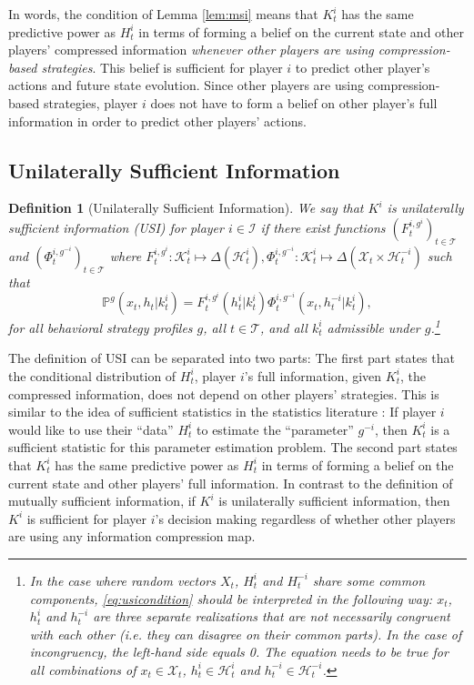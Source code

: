 \documentclass[pdflatex,sn-basic]{sn-jnl}
\renewcommand{\Pr}{\mathbb{P}}
\newcommand{\Comp}{K}
\newcommand{\comp}{k}
\newcommand{\Compset}{\mathcal{K}}
\theoremstyle{thmstyleone}%
\theoremstyle{thmstyletwo}%
\theoremstyle{thmstylethree}%
\newtheorem{defn}{Definition}
\begin{document}
In words, the condition of Lemma \ref{lem:msi} means that $\Comp_t^i$ has the same predictive power as $H_t^i$ in terms of forming a belief on the current state and other players' compressed information \emph{whenever other players are using compression-based strategies}. This belief is sufficient for player $i$ to predict other player's actions and future state evolution. Since other players are using compression-based strategies, player $i$ does not have to form a belief on other player's full information in order to predict other players' actions.

\subsection{Unilaterally Sufficient Information}\label{sec:usi}

\begin{defn}[Unilaterally Sufficient Information]\label{def:usi}
	We say that $\Comp^i$ is \emph{unilaterally sufficient information} (USI) for player $i\in\mathcal{I}$ if there exist functions $(F_t^{i, g^i})_{t\in\mathcal{T}}$ and $(\Phi_t^{i, g^{-i}})_{t\in\mathcal{T}}$ where $F_t^{i, g^i}\colon\Compset_t^i\mapsto \Delta(\mathcal{H}_t^i), \Phi_t^{i, g^{-i}}\colon\Compset_t^i \mapsto \Delta(\mathcal{X}_t\times \mathcal{H}_t^{-i})$ such that
	\begin{equation}\label{eq:usicondition}
		\Pr^{g}(x_t, h_t|\comp_t^i) = F_t^{i, g^i}(h_t^i|\comp_t^i)\Phi_t^{i,g^{-i}}(x_t, h_t^{-i}|\comp_t^i),
	\end{equation}
	for all behavioral strategy profiles $g$, all $t\in\mathcal{T}$, and all $\comp_t^i$ admissible under $g$.\footnote{In the case where random vectors $X_t$, $H_t^i$ and $H_t^{-i}$ share some common components, \eqref{eq:usicondition} should be interpreted in the following way: $x_t$, $h_t^i$ and $h_t^{-i}$ are three separate realizations that are not necessarily congruent with each other (i.e. they can disagree on their common parts). In the case of incongruency, the left-hand side equals 0. The equation needs to be true for all combinations of $x_t\in \mathcal{X}_t$, $h_t^i\in\mathcal{H}_t^i$ and $h_t^{-i}\in\mathcal{H}_t^{-i}$.}
\end{defn}


The definition of USI can be separated into two parts: The first part states that the conditional distribution of $H_t^i$, player $i$'s full information, given $\Comp_t^i$, the compressed information, does not depend on other players' strategies. This is similar to the idea of sufficient statistics in the statistics literature \citep{kay1993fundamentals}: If player $i$ would like to use their ``data'' $H_t^i$ to estimate the ``parameter'' $g^{-i}$, then $\Comp_t^i$ is a sufficient statistic for this parameter estimation problem. The second part states that $\Comp_t^i$ has the same predictive power as $H_t^i$ in terms of forming a belief on the current state and other players' full information. 
In contrast to the definition of mutually sufficient information, if $\Comp^i$ is unilaterally sufficient information, then $\Comp^i$ is sufficient for player $i$'s decision making regardless of whether other players are using any information compression map.
\end{document}
